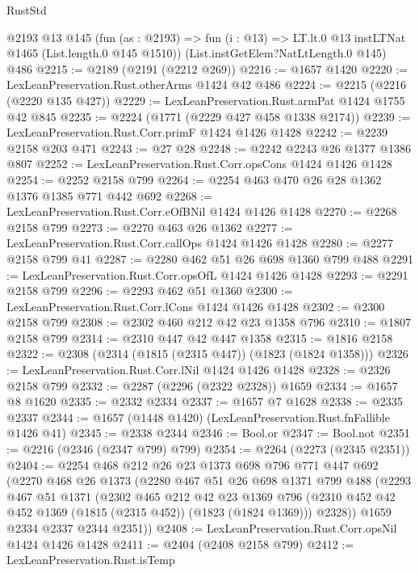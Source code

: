 \begin{lexlean}{RustStd}
\begin{coremodule}
    @2193
    @13
    @145
    (fun (as : @2193) =>
    fun (i : @13) => LT.lt.{0} @13 instLTNat @1465 (List.length.{0} @145 @1510))
    (List.instGetElem?NatLtLength.{0} @145)
    @486
@2215 := @2189 (@2191 (@2212 @269))
@2216 := @1657 @1420
@2220 := LexLeanPreservation.Rust.otherArms @1424 @42 @486
@2224 := @2215 (@2216 (@2220 @135 @427))
@2229 := LexLeanPreservation.Rust.armPat @1424 @1755 @42 @845
@2235 := @2224 (@1771 (@2229 @427 @458 @1338 @2174))
@2239 := LexLeanPreservation.Rust.Corr.primF @1424 @1426 @1428
@2242 := @2239 @2158 @203 @471
@2243 := @27 @28
@2248 := @2242 @2243 @26 @1377 @1386 @807
@2252 := LexLeanPreservation.Rust.Corr.opsCons @1424 @1426 @1428
@2254 := @2252 @2158 @799
@2264 := @2254 @463 @470 @26 @28 @1362 @1376 @1385 @771 @442 @692
@2268 := LexLeanPreservation.Rust.Corr.eOfBNil @1424 @1426 @1428
@2270 := @2268 @2158 @799
@2273 := @2270 @463 @26 @1362
@2277 := LexLeanPreservation.Rust.Corr.callOps @1424 @1426 @1428
@2280 := @2277 @2158 @799 @41
@2287 := @2280 @462 @51 @26 @698 @1360 @799 @488
@2291 := LexLeanPreservation.Rust.Corr.opsOfL @1424 @1426 @1428
@2293 := @2291 @2158 @799
@2296 := @2293 @462 @51 @1360
@2300 := LexLeanPreservation.Rust.Corr.lCons @1424 @1426 @1428
@2302 := @2300 @2158 @799
@2308 := @2302 @460 @212 @42 @23 @1358 @796
@2310 := @1807 @2158 @799
@2314 := @2310 @447 @42 @447 @1358
@2315 := @1816 @2158
@2322 := @2308 (@2314 (@1815 (@2315 @447)) (@1823 (@1824 @1358)))
@2326 := LexLeanPreservation.Rust.Corr.lNil @1424 @1426 @1428
@2328 := @2326 @2158 @799
@2332 := @2287 (@2296 (@2322 @2328)) @1659
@2334 := @1657 @8 @1620
@2335 := @2332 @2334
@2337 := @1657 @7 @1628
@2338 := @2335 @2337
@2344 := @1657 (@1448 @1420) (LexLeanPreservation.Rust.fnFallible @1426 @41)
@2345 := @2338 @2344
@2346 := Bool.or
@2347 := Bool.not
@2351 := @2216 (@2346 (@2347 @799) @799)
@2354 := @2264 (@2273 (@2345 @2351))
@2404 := @2254
    @468
    @212
    @26
    @23
    @1373
    @698
    @796
    @771
    @447
    @692
    (@2270
      @468
      @26
      @1373
      (@2280
        @467
        @51
        @26
        @698
        @1371
        @799
        @488
        (@2293
          @467
          @51
          @1371
          (@2302
            @465
            @212
            @42
            @23
            @1369
            @796
            (@2310 @452 @42 @452 @1369 (@1815 (@2315 @452)) (@1823 (@1824 @1369)))
            @2328))
        @1659
        @2334
        @2337
        @2344
        @2351))
@2408 := LexLeanPreservation.Rust.Corr.opsNil @1424 @1426 @1428
@2411 := @2404 (@2408 @2158 @799)
@2412 := LexLeanPreservation.Rust.isTemp

\end{coremodule}
\end{lexlean}
